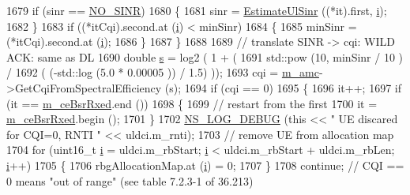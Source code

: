 \begin{DoxyCode}
1679               \textcolor{keywordflow}{if} (sinr == \hyperlink{cqa-ff-mac-scheduler_8h_a520d71777be043568160c783a9c65fd5}{NO\_SINR})
1680                 \{
1681                   sinr = \hyperlink{classns3_1_1TtaFfMacScheduler_a51fcb3b65dbfff2b28d66930073a45c8}{EstimateUlSinr} ((*it).first, \hyperlink{bernuolliDistribution_8m_a6f6ccfcf58b31cb6412107d9d5281426}{i});
1682                 \}
1683               \textcolor{keywordflow}{if} ((*itCqi).second.at (\hyperlink{bernuolliDistribution_8m_a6f6ccfcf58b31cb6412107d9d5281426}{i}) < minSinr)
1684                 \{
1685                   minSinr = (*itCqi).second.at (\hyperlink{bernuolliDistribution_8m_a6f6ccfcf58b31cb6412107d9d5281426}{i});
1686                 \}
1687             \}
1688 
1689           \textcolor{comment}{// translate SINR -> cqi: WILD ACK: same as DL}
1690           \textcolor{keywordtype}{double} \hyperlink{generate__test__data__lte__sinr_8m_ad83eeb3a142285d1243a08c6b7026df8}{s} = log2 ( 1 + (
1691                                  std::pow (10, minSinr / 10 )  /
1692                                  ( (-std::log (5.0 * 0.00005 )) / 1.5) ));
1693           cqi = \hyperlink{classns3_1_1TtaFfMacScheduler_a9c8e60d48cae88a03fb5621285733186}{m\_amc}->GetCqiFromSpectralEfficiency (s);
1694           \textcolor{keywordflow}{if} (cqi == 0)
1695             \{
1696               it++;
1697               \textcolor{keywordflow}{if} (it == \hyperlink{classns3_1_1TtaFfMacScheduler_a6b88fda6059c5679b747c2e1856729b1}{m\_ceBsrRxed}.end ())
1698                 \{
1699                   \textcolor{comment}{// restart from the first}
1700                   it = \hyperlink{classns3_1_1TtaFfMacScheduler_a6b88fda6059c5679b747c2e1856729b1}{m\_ceBsrRxed}.begin ();
1701                 \}
1702               \hyperlink{group__logging_ga413f1886406d49f59a6a0a89b77b4d0a}{NS\_LOG\_DEBUG} (\textcolor{keyword}{this} << \textcolor{stringliteral}{" UE discared for CQI=0, RNTI "} << uldci.m\_rnti);
1703               \textcolor{comment}{// remove UE from allocation map}
1704               \textcolor{keywordflow}{for} (uint16\_t \hyperlink{bernuolliDistribution_8m_a6f6ccfcf58b31cb6412107d9d5281426}{i} = uldci.m\_rbStart; \hyperlink{bernuolliDistribution_8m_a6f6ccfcf58b31cb6412107d9d5281426}{i} < uldci.m\_rbStart + uldci.m\_rbLen; 
      \hyperlink{bernuolliDistribution_8m_a6f6ccfcf58b31cb6412107d9d5281426}{i}++)
1705                 \{
1706                   rbgAllocationMap.at (\hyperlink{bernuolliDistribution_8m_a6f6ccfcf58b31cb6412107d9d5281426}{i}) = 0;
1707                 \}
1708               \textcolor{keywordflow}{continue}; \textcolor{comment}{// CQI == 0 means "out of range" (see table 7.2.3-1 of 36.213)}

\end{DoxyCode}
